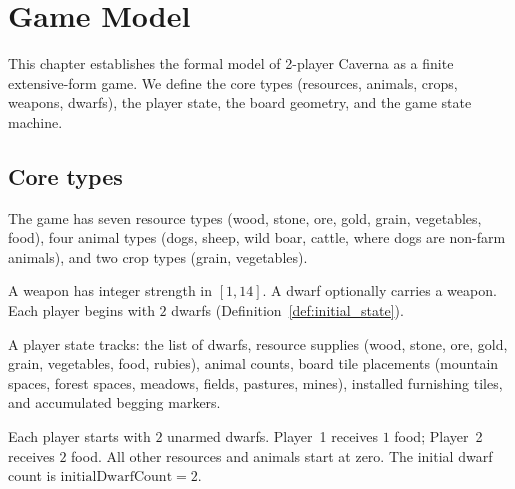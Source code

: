 \chapter{Game Model}

This chapter establishes the formal model of 2-player Caverna as a finite
extensive-form game.  We define the core types (resources, animals, crops,
weapons, dwarfs), the player state, the board geometry, and the game state
machine.

\section{Core types}

\begin{definition}
  \label{def:core_types}
  \leanok
  The game has seven resource types (wood, stone, ore, gold, grain, vegetables, food),
  four animal types (dogs, sheep, wild boar, cattle, where dogs are non-farm animals),
  and two crop types (grain, vegetables).
\end{definition}

\begin{definition}
  \label{def:weapons_dwarfs}
  \leanok
  A weapon has integer strength in $[1,14]$.  A dwarf optionally carries a weapon.
  Each player begins with $2$ dwarfs (Definition~\ref{def:initial_state}).
\end{definition}

\begin{definition}
  \label{def:player_state}
  \leanok
  A player state tracks: the list of dwarfs, resource supplies
  (wood, stone, ore, gold, grain, vegetables, food, rubies),
  animal counts, board tile placements (mountain spaces, forest spaces,
  meadows, fields, pastures, mines), installed furnishing tiles,
  and accumulated begging markers.
\end{definition}

\begin{definition}
  \label{def:initial_state}
  \leanok
  Each player starts with $2$ unarmed dwarfs.
  Player~1 receives $1$ food; Player~2 receives $2$ food.
  All other resources and animals start at zero.
  The initial dwarf count is $\text{initialDwarfCount} = 2$.
\end{definition}

